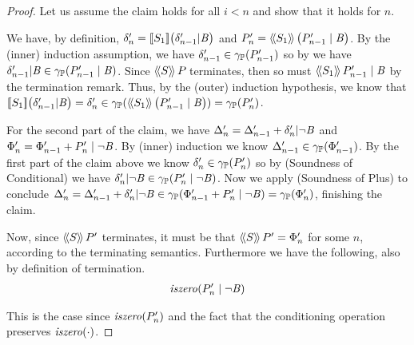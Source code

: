 \begin{proof}
Let us assume the claim holds for all $ i < n $ and show that it holds
for $ n $. 

We have, by definition, $ \delta'_n
= [\![{S_1}]\!]{\left( \delta'_{n-1} | \mathit{B}\right)} $ and $ P_{n}'
= \langle\!\langle{S_1}\rangle\!\rangle\,{\left( P_{n-1}' \mid \mathit{B} \right)} $. By the
(inner) induction assumption, we have
$ \delta'_{n-1} \in \gamma_{\mathbb{P}}(P_{n-1}') $ so by  we
have
$ \delta'_{n-1} | \mathit{B} \in \gamma_{\mathbb{P}}(P_{n-1}' \mid \mathit{B})
$. Since $ \langle\!\langle{S}\rangle\!\rangle\,{P_{}} $ terminates, then so must
$ \langle\!\langle{S_1}\rangle\!\rangle\,{P_{n-1}' \mid \mathit{B}} $ by the termination
remark. Thus, by the (outer) induction hypothesis, we know that
$ [\![{S_1}]\!]{\left( \delta'_{n-1} | \mathit{B}\right)}
= \delta'_n \in \gamma_{\mathbb{P}}(\langle\!\langle{S_1}\rangle\!\rangle\,{\left( P_{n-1}' \mid \mathit{B} \right)})
= \gamma_{\mathbb{P}}(P_{n}') $.

For the second part of the claim, we have $ \Delta'_n = \Delta'_{n-1}
+ \delta'_n | \neg \mathit{B} $ and $ \Phi'_n = \Phi'_{n-1}
+ P_{n}' \mid \neg \mathit{B} $. By (inner) induction we know
$ \Delta'_{n-1} \in \gamma_{\mathbb{P}}(\Phi'_{n-1}) $. By the first part of the claim above
we know $ \delta'_n \in \gamma_{\mathbb{P}}(P_{n}') $ so by 
(Soundness of Conditional) we have
$ \delta'_n | \neg \mathit{B} \in \gamma_{\mathbb{P}}(P_{n}' \mid \neg \mathit{B})
$. Now we apply  (Soundness of Plus) to conclude
$ \Delta'_n = \Delta'_{n-1}
+ \delta'_n | \neg \mathit{B} \in \gamma_{\mathbb{P}}(\Phi'_{n-1}
+ P_{n}' \mid \neg \mathit{B}) = \gamma_{\mathbb{P}}(\Phi'_{n}) $, finishing the
claim.

Now, since $ \langle\!\langle{S}\rangle\!\rangle\,{P_{}'} $ terminates, it must be that
$ \langle\!\langle{S}\rangle\!\rangle\,{P_{}'} = \Phi'_n $ for some $ n $, according to the terminating
semantics. Furthermore we have the following, also by definition of termination.
\begin{align}
\label{lem:pp:while:claim2a} \iszero{\absdcond{\pp{n}'}{\neg \bexp}}
\end{align}

This is the case since $ \mathit{iszero}(P_{n}') $ and the fact that the
conditioning operation preserves $ \mathit{iszero}(\cdot) $.



\end{proof}
